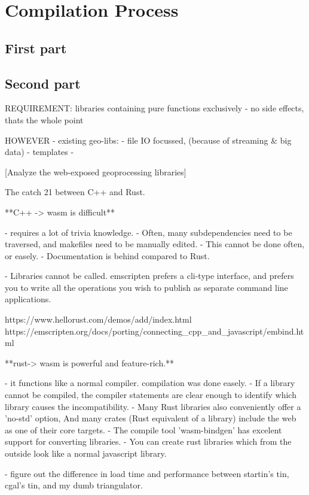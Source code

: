 \section{Compilation Process}
\label{sec:analyses:compilation}

\subsection{First part}

\begin{note}
\end{note}
  
\subsection{Second part}


\begin{note}

  REQUIREMENT: libraries containing pure functions exclusively
  - no side effects, thats the whole point
  
  
  HOWEVER 
  - existing geo-libs: 
    - file IO focussed, (because of streaming \& big data)
    - templates
    - 
  
  [Analyze the web-exposed geoprocessing libraries]
  
  
  The catch 21 between C++ and Rust.  

  **C++ -> wasm is difficult**
  
  - requires a lot of trivia knowledge. 
    - Often, many subdependencies need to be traversed, and makefiles need to be manually edited. 
    - This cannot be done often, or easely. 
  - Documentation is behind compared to Rust.

  - Libraries cannot be called. emscripten prefers a cli-type interface, and prefers you to write all the operations you wish to publish as separate command line applications. 

  https://www.hellorust.com/demos/add/index.html
  https://emscripten.org/docs/porting/connecting_cpp_and_javascript/embind.html


  **rust-> wasm is powerful and feature-rich.** 
  
  - it functions like a normal compiler. compilation was done easely. 
  - If a library cannot be compiled, the compiler statements are clear enough to identify which library causes the incompatibility. 
  - Many Rust libraries also conveniently offer a 'no-std' option, 
    And many crates (Rust equivalent of a library) include the web as one of their core targets. 
  - The compile tool 'wasm-bindgen' has excelent support for converting libraries. 
    - You can create rust libraries which from the outside look like a normal javascript library. 


    - figure out the difference in load time and performance between startin's tin, cgal's tin, and my dumb triangulator.

\end{note}

